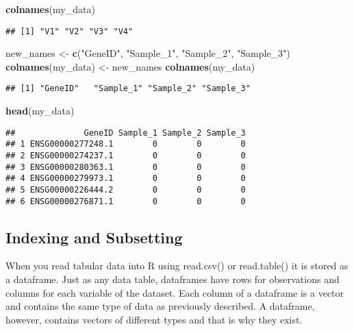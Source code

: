 \documentclass[]{article}
\newenvironment{Shaded}{\begin{snugshade}}{\end{snugshade}}
\newcommand{\KeywordTok}[1]{\textcolor[rgb]{0.13,0.29,0.53}{\textbf{#1}}}
\newcommand{\StringTok}[1]{\textcolor[rgb]{0.31,0.60,0.02}{#1}}
\newcommand{\NormalTok}[1]{#1}
\begin{document}
\begin{Shaded}
\begin{Highlighting}[]
\KeywordTok{colnames}\NormalTok{(my_data)}
\end{Highlighting}
\end{Shaded}

\begin{verbatim}
## [1] "V1" "V2" "V3" "V4"
\end{verbatim}

\begin{Shaded}
\begin{Highlighting}[]
\NormalTok{new_names <-}\StringTok{ }\KeywordTok{c}\NormalTok{(}\StringTok{"GeneID"}\NormalTok{, }\StringTok{"Sample_1"}\NormalTok{, }\StringTok{"Sample_2"}\NormalTok{, }\StringTok{"Sample_3"}\NormalTok{)}
\KeywordTok{colnames}\NormalTok{(my_data) <-}\StringTok{ }\NormalTok{new_names}
\KeywordTok{colnames}\NormalTok{(my_data)}
\end{Highlighting}
\end{Shaded}

\begin{verbatim}
## [1] "GeneID"   "Sample_1" "Sample_2" "Sample_3"
\end{verbatim}

\begin{Shaded}
\begin{Highlighting}[]
\KeywordTok{head}\NormalTok{(my_data)}
\end{Highlighting}
\end{Shaded}

\begin{verbatim}
##              GeneID Sample_1 Sample_2 Sample_3
## 1 ENSG00000277248.1        0        0        0
## 2 ENSG00000274237.1        0        0        0
## 3 ENSG00000280363.1        0        0        0
## 4 ENSG00000279973.1        0        0        0
## 5 ENSG00000226444.2        0        0        0
## 6 ENSG00000276871.1        0        0        0
\end{verbatim}

\subsection{Indexing and Subsetting}\label{indexing-and-subsetting}

When you read tabular data into R using read.csv() or read.table() it is
stored as a dataframe. Just as any data table, dataframes have rows for
observations and columns for each variable of the dataset. Each column
of a dataframe is a vector and contains the same type of data as
previously described. A dataframe, however, contains vectors of
different types and that is why they exist.
\end{document}
